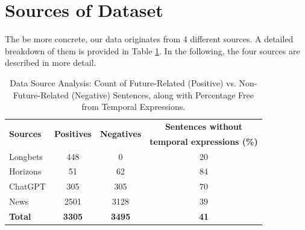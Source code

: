 \documentclass[a4paper,10pt]{report} %
\begin{document}
\section{Sources of Dataset}
The be more concrete, our data originates from 4 different sources. A detailed breakdown of them is provided in Table \ref{tab:dataset}. In the following, the four sources are described in more detail.

\begin{table}[h]
  \centering
  \begin{tabular}{lccc}
    \toprule
    \multirow{2}{*}{\textbf{Sources}} & \multirow{2}{*}{\textbf{Positives}} & \multirow{2}{*}{\textbf{Negatives}} & \textbf{Sentences without} \\
    & & & \textbf{temporal expressions (\%)} \\
    \midrule
    Longbets & 448 & 0 & 20 \\
    Horizons & 51 & 62 & 84 \\
    ChatGPT & 305 & 305 & 70 \\
    News & 2501 & 3128 & 39 \\
    \bottomrule
    \textbf{Total} & \textbf{3305} & \textbf{3495} & \textbf{41} \\
  \bottomrule
  \end{tabular}
  \caption{Data Source Analysis: Count of Future-Related (Positive) vs. Non-Future-Related (Negative) Sentences, along with Percentage Free from Temporal Expressions.}
  \label{tab:dataset}
\end{table}
\end{document}
